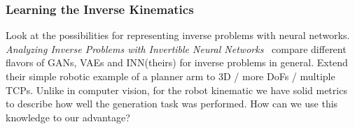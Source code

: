 \documentclass[a4paper]{article}
\begin{document}


\subsubsection{Learning the Inverse Kinematics}
Look at the possibilities for representing inverse problems with neural networks.
\textit{Analyzing Inverse Problems with Invertible Neural Networks}~\cite{Ardizzone2018}
compare different flavors of GANs, VAEs and INN(theirs) for inverse problems in general.
Extend their simple robotic example of a planner arm to 3D / more DoFs / multiple TCPs.
Unlike in computer vision, for the robot kinematic we have solid metrics to describe how well the generation task was performed.
How can we use this knowledge to our advantage?
\end{document}
